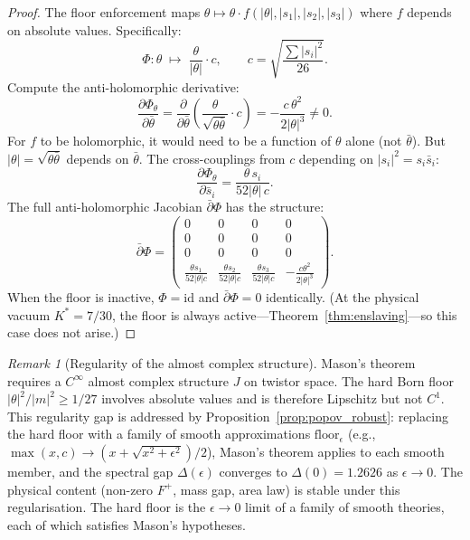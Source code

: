 \documentclass[11pt,a4paper]{article}
\theoremstyle{definition}
\theoremstyle{remark}
\newtheorem{remark}[theorem]{Remark}
\newcommand{\dbar}{\bar{\partial}}
\begin{document}
\begin{proof}
The floor enforcement maps $\theta\mapsto\theta\cdot f(|\theta|,|s_1|,|s_2|,|s_3|)$ where $f$ depends on absolute values. Specifically:
\[
\Phi:\theta\;\mapsto\;\frac{\theta}{|\theta|}\cdot c,\qquad c=\sqrt{\frac{\sum|s_i|^2}{26}}.
\]
Compute the anti-holomorphic derivative:
\begin{equation}\label{eq:kink}
\frac{\partial\Phi_\theta}{\partial\bar{\theta}}=\frac{\partial}{\partial\bar{\theta}}\!\left(\frac{\theta}{\sqrt{\theta\bar{\theta}}}\cdot c\right)=-\frac{c\,\theta^2}{2|\theta|^3}\neq 0.
\end{equation}
For $f$ to be holomorphic, it would need to be a function of $\theta$ alone (not $\bar{\theta}$). But $|\theta|=\sqrt{\theta\bar{\theta}}$ depends on $\bar{\theta}$. The cross-couplings from $c$ depending on $|s_i|^2=s_i\bar{s}_i$:
\begin{equation}\label{eq:cross}
\frac{\partial\Phi_\theta}{\partial\bar{s}_i}=\frac{\theta\,s_i}{52|\theta|\,c}.
\end{equation}
The full anti-holomorphic Jacobian $\dbar\Phi$ has the structure:
\begin{equation}\label{eq:jacobian}
\dbar\Phi=\begin{pmatrix}0&0&0&0\\0&0&0&0\\0&0&0&0\\\frac{\theta s_1}{52|\theta|c}&\frac{\theta s_2}{52|\theta|c}&\frac{\theta s_3}{52|\theta|c}&-\frac{c\theta^2}{2|\theta|^3}\end{pmatrix}.
\end{equation}
When the floor is inactive, $\Phi=\mathrm{id}$ and $\dbar\Phi=0$ identically. (At the physical vacuum $K^*=7/30$, the floor is always active---Theorem~\ref{thm:enslaving}---so this case does not arise.)
\end{proof}

\begin{remark}[Regularity of the almost complex structure]\label{rem:mason_regularity}
Mason's theorem~\cite{Mason2005} requires a $C^\infty$ almost complex structure $J$ on twistor space. The hard Born floor $|\theta|^2/|m|^2\geq 1/27$ involves absolute values and is therefore Lipschitz but not $C^1$. This regularity gap is addressed by Proposition~\ref{prop:popov_robust}: replacing the hard floor with a family of smooth approximations $\mathrm{floor}_\epsilon$ (e.g., $\max(x,c)\to(x+\sqrt{x^2+\epsilon^2})/2$), Mason's theorem applies to each smooth member, and the spectral gap $\Delta(\epsilon)$ converges to $\Delta(0)=1.2626$ as $\epsilon\to 0$. The physical content (non-zero $F^+$, mass gap, area law) is stable under this regularisation. The hard floor is the $\epsilon\to 0$ limit of a family of smooth theories, each of which satisfies Mason's hypotheses.
\end{remark}
\end{document}
